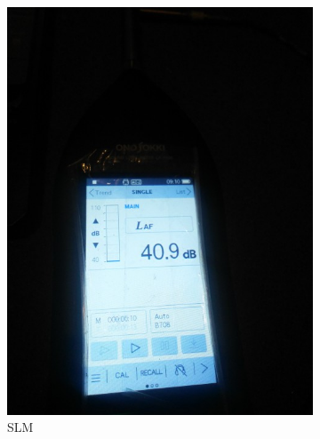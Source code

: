 \documentclass[12pt,]{article}
\begin{document}
	\begin{figure}[!ht]
		\centering
		\begin{subfigure}[b]{0.25\textwidth}
			\includegraphics[width=\textwidth]{images/noise_slm}
			\caption{SLM}
		\end{subfigure}
		\begin{subfigure}[b]{0.25\textwidth}

\end{subfigure}
\end{figure}
\end{document}
